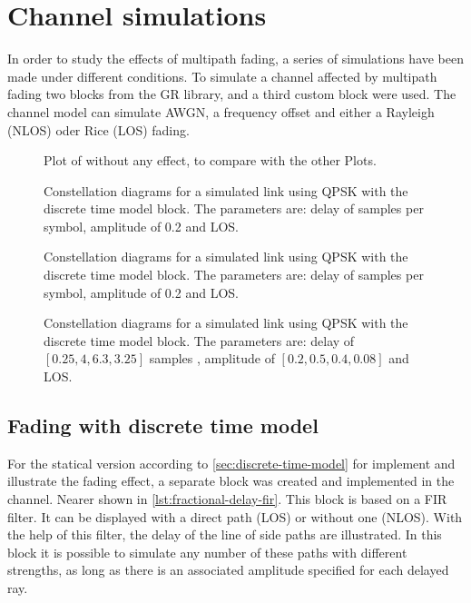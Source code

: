 \section{Channel simulations}

In order to study the effects of multipath fading, a series of simulations have been made under different conditions. To simulate a channel affected by multipath fading two blocks from the GR library, and a third custom block were used. The channel model can simulate AWGN, a frequency offset and either a Rayleigh (NLOS) oder Rice (LOS) fading.

\begin{figure}
	\centering
	
	\caption{ Plot of without any effect, to compare with the other Plots.
	}
\end{figure}

\begin{figure}
	\centering
	
	\caption{
		Constellation diagrams for a simulated link using QPSK with the discrete time model block.
		The parameters are: delay of samples per symbol, amplitude of 0.2 and LOS.
	}
	\label{fig:static-symb-specal-case}
\end{figure}

\begin{figure}
	\centering
	
	\caption{
		Constellation diagrams for a simulated link using QPSK with the discrete time model block.
		The parameters are: delay of samples per symbol, amplitude of 0.2 and LOS.
	}
	\label{fig:static-symb-specal-case-NLOS}
\end{figure}

\begin{figure}
	\centering
	
	\caption{
		Constellation diagrams for a simulated link using QPSK with the discrete time model block.
		The parameters are: delay of \([0.25,4,6.3,3.25]\) samples , amplitude of \([0.2,0.5,0.4,0.08]\) and LOS.
	}
	\label{fig:static-symb-specal-case-vec}
\end{figure}

\subsection{Fading with discrete time model}

For the statical version according to \ref{sec:discrete-time-model} for implement and illustrate the fading effect, a separate block was created and implemented in the channel. Nearer shown in \ref{lst:fractional-delay-fir}. This block is based on a FIR filter. It can be displayed with a direct path (LOS) or without one (NLOS).
With the help of this filter, the delay of the line of side paths are illustrated. In this block it is possible to simulate any number of these paths with different strengths, as long as there is an associated amplitude specified for each delayed ray. 

